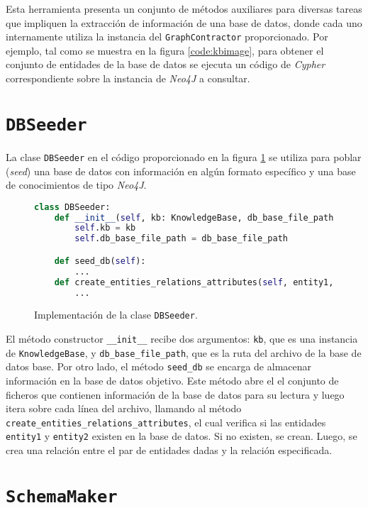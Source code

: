 Esta herramienta presenta un conjunto de métodos auxiliares para diversas tareas que impliquen la extracción de información de una base de datos, donde cada uno internamente utiliza la instancia del \texttt{GraphContractor} proporcionado. Por ejemplo, tal como se muestra en la figura \ref{code:kbimage}, para obtener el conjunto de entidades de la base de datos se ejecuta un código de \textit{Cypher} correspondiente sobre la instancia de \textit{Neo4J} a consultar.

\section{\texttt{DBSeeder}}

La clase \texttt{DBSeeder} en el código proporcionado en la figura \ref{code:dbseeder} se utiliza para poblar (\textit{seed}) una base de datos con información en algún formato específico y una base de conocimientos de tipo \textit{Neo4J}.

\begin{figure}[H]
\begin{lstlisting}[language=python]
class DBSeeder:
	def __init__(self, kb: KnowledgeBase, db_base_file_path: str) -> None:
        self.kb = kb
        self.db_base_file_path = db_base_file_path

    def seed_db(self):
		...
	def create_entities_relations_attributes(self, entity1, relation_type, entity2):
		...
\end{lstlisting}
\caption{Implementación de la clase \texttt{DBSeeder}.}
\label{code:dbseeder}
\end{figure}

El método constructor \texttt{\_\_init\_\_} recibe dos argumentos: \texttt{kb}, que es una instancia de \texttt{KnowledgeBase}, y \texttt{db\_base\_file\_path}, que es la ruta del archivo de la base de datos base. Por otro lado, el método \texttt{seed\_db} se encarga de almacenar información en la base de datos objetivo. Este método abre el el conjunto de ficheros que contienen información de la base de datos para su lectura y luego itera sobre cada línea del archivo, llamando al método \texttt{create\_entities\_relations\_attributes}, el cual verifica si las entidades \texttt{entity1} y \texttt{entity2} existen en la base de datos. Si no existen, se crean. Luego, se crea una relación entre el par de entidades dadas y la relación especificada.


\section{\texttt{SchemaMaker}}

